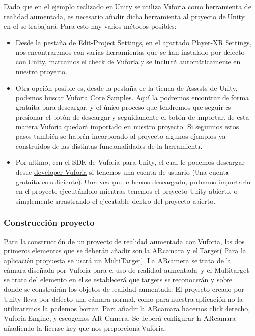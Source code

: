 Dado que en el ejemplo realizado en Unity se utiliza Vuforia como herramienta de realidad aumentada, es necesario añadir dicha herramienta al proyecto de Unity en el se trabajará. Para esto hay varios métodos posibles:
\begin{itemize}
\item Desde la pestaña de Edit-Project Settings, en el apartado Player-XR Settings, nos encontraremos con varias herramientas que se han instalado por defecto con Unity, marcamos el check de Vuforia y se incluirá automáticamente en nuestro proyecto.

\item Otra opción posible es, desde la pestaña de la tienda de Assests de Unity, podemos buscar Vuforia Core Samples. Aquí la podremos encontrar de forma gratuita para descargar, y el único proceso que tendremos que seguir es presionar el botón de descargar y seguidamente el botón de importar, de esta manera Vuforia quedará importado en nuestro proyecto. Si seguimos estos pasos también se habrán incorporado al proyecto algunos ejemplos ya construidos de las distintas funcionalidades de la herramienta.

\item Por ultimo, con el SDK de Vuforia para Unity, el cual le podemos descargar desde \href{https://developer.vuforia.com/downloads/sdk}{developer Vuforia} si tenemos una cuenta de usuario (Una cuenta gratuita es suficiente). Una vez que le hemos descargado, podemos importarlo en el proyecto ejecutándolo mientras tenemos el proyecto Unity abierto, o simplemente arrastrando el ejecutable dentro del proyecto abierto.	
\end{itemize}

\subsubsection{Construcción proyecto}

Para la construcción de un proyecto de realidad aumentada con Vuforia, los dos primeros elementos que se deberán añadir son la ARcamara y el Target( Para la aplicación propuesta se usará un MultiTarget). La ARcamera se trata de la cámara diseñada por Vuforia para el uso de realidad aumentada, y el Multitarget se trata del elemento en el se establecerá que targets se reconocerán y sobre donde se construirán los objetos de realidad aumentada.
El proyecto creado por Unity lleva por defecto una cámara normal, como para nuestra aplicación no la utilizaremos la podemos borrar.
Para añadir la ARcamara hacemos click derecho, Vuforia Engine, y escogemos AR Camera. Se deberá configurar la ARcamara añadiendo la license key que nos proporciona Vuforia.

